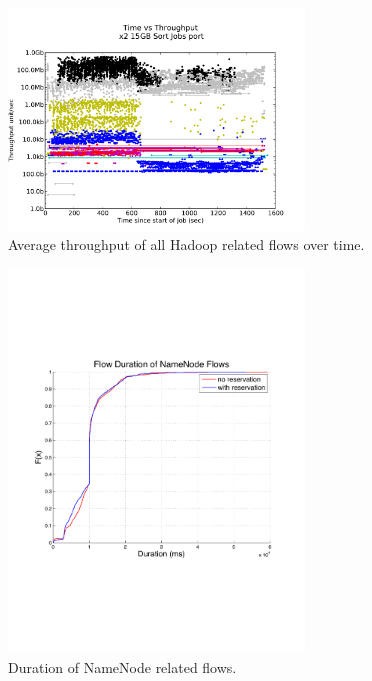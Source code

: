 \begin{figure}
\centering
\includegraphics[width=0.7\textwidth]{figures/clock_v_throughput_port.pdf}
\caption{Average throughput of all Hadoop related flows over time.}
\label{fig:tput}
\end{figure}

\begin{figure}
\centering
\includegraphics[width=0.7\textwidth]{figures/flow_durations.pdf}
\caption{Duration of NameNode related flows.}
\label{fig:duration_cdf}
\end{figure}

